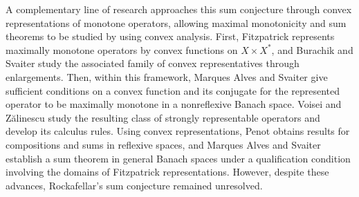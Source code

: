\documentclass[11pt]{article}
\theoremstyle{definition}
\theoremstyle{remark}
\begin{document}
A complementary line of research approaches this sum conjecture through convex representations of monotone operators, allowing maximal monotonicity and sum theorems to be studied by using convex analysis. First, Fitzpatrick \cite{fitzpatrick1988} represents maximally monotone operators by convex functions on $X\times X^*$, and Burachik and Svaiter \cite{burachiksvaiter2002} study the associated family of convex representatives through enlargements. Then, within this framework, Marques Alves and Svaiter \cite{marquesalvessvaiter2008br} give sufficient conditions on a convex function and its conjugate for the represented operator to be maximally monotone in a nonreflexive Banach space. Voisei and Z\u{a}linescu \cite{voiseizalinescu2009} study the resulting class of strongly representable operators and develop its calculus rules. Using convex representations, Penot \cite{penot2004} obtains results for compositions and sums in reflexive spaces, and Marques Alves and Svaiter \cite{marquessvaiter2012} establish a sum theorem in general Banach spaces under a qualification condition involving the domains of Fitzpatrick representations. However, despite these advances, Rockafellar's sum conjecture remained unresolved.







\end{document}

